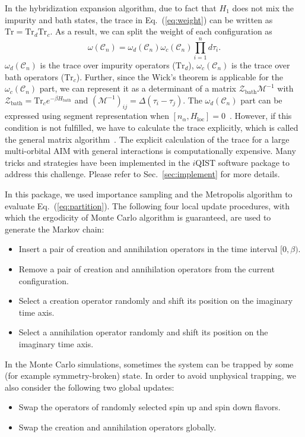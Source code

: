 In the hybridization expansion algorithm, due to fact that $H_1$ does not mix the impurity and bath states, 
the trace in Eq.~(\ref{eq:weight}) can be written as $\text{Tr} = \text{Tr}_d \text{Tr}_c$. 
As a result, we can split the weight of each configuration as 
\begin{equation}
\omega(\mathcal{C}_n) = \omega_{d}(\mathcal{C}_n) \omega_{c}(\mathcal{C}_n) \prod\limits_{i=1}^{n} d\tau_i.
\end{equation}
$\omega_{d}(\mathcal{C}_n)$ is the trace over impurity operators ($\text{Tr}_d$), $\omega_{c}(\mathcal{C}_n)$ is the trace over bath operators ($\text{Tr}_c$). Further, since the Wick's theorem is applicable for the $\omega_c(\mathcal{C}_n)$ part, we can represent it as a determinant of a matrix $\mathcal{Z}_{\text{bath}}\mathcal{M}^{-1}$ with $\mathcal{Z}_{\text{bath}}=\text{Tr}_c e^{-\beta H_{\text{bath}}}$ and $(\mathcal{M}^{-1})_{ij} = \Delta(\tau_i - \tau_j)$. The $\omega_{d}(\mathcal{C}_n)$ part can be expressed using segment representation when $[n_{\alpha}, H_{\text{loc}}] = 0$~\cite{PhysRevLett.97.076405}. However, if this condition is not fulfilled, we have to calculate the trace explicitly, which is called the general matrix algorithm~\cite{PhysRevB.75.155113,PhysRevB.74.155107}. The explicit calculation of the trace for a large multi-orbital AIM with general interactions is computationally expensive. Many tricks and strategies have been implemented in the $i$QIST software package to address this challenge. Please refer to Sec.~\ref{sec:implement} for more details.

In this package, we used importance sampling and the Metropolis algorithm to evaluate Eq.~(\ref{eq:partition}). 
The following four local update procedures, with which the ergodicity of Monte Carlo algorithm is guaranteed, are used to generate the Markov chain: 
\begin{itemize}
\item Insert a pair of creation and annihilation operators in the time interval $[0,\beta)$.
\item Remove a pair of creation and annihilation operators from the current configuration.
\item Select a creation operator randomly and shift its position on the imaginary time axis.
\item Select a annihilation operator randomly and shift its position on the imaginary time axis.
\end{itemize}
In the Monte Carlo simulations, sometimes the system can be trapped by some (for example symmetry-broken) state. In order to avoid unphysical trapping, we also consider the following two global updates:
\begin{itemize}
\item Swap the operators of randomly selected spin up and spin down flavors.
\item Swap the creation and annihilation operators globally.
\end{itemize}

